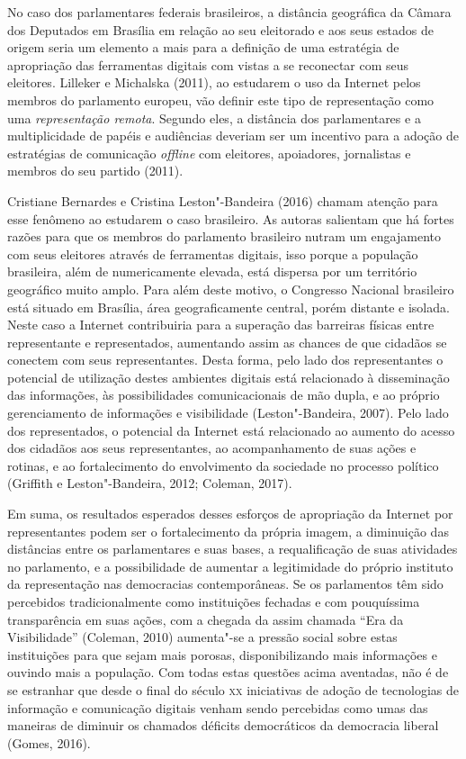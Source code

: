 No caso dos parlamentares federais brasileiros, a distância geográfica
da Câmara dos Deputados em Brasília em relação ao seu eleitorado e aos
seus estados de origem seria um elemento a mais para a definição de uma
estratégia de apropriação das ferramentas digitais com vistas a se
reconectar com seus eleitores. Lilleker e Michalska (2011), ao estudarem
o uso da Internet pelos membros do parlamento europeu, vão definir este
tipo de representação como uma \emph{representação remota}. Segundo
eles, a distância dos parlamentares e a multiplicidade de papéis e
audiências deveriam ser um incentivo para a adoção de estratégias de
comunicação \emph{offline} com eleitores, apoiadores, jornalistas e membros do
seu partido (2011).

Cristiane Bernardes e Cristina Leston"-Bandeira (2016) chamam atenção
para esse fenômeno ao estudarem o caso brasileiro. As autoras salientam
que há fortes razões para que os membros do parlamento brasileiro nutram
um engajamento com seus eleitores através de ferramentas digitais, isso
porque a população brasileira, além de numericamente elevada, está
dispersa por um território geográfico muito amplo. Para além deste
motivo, o Congresso Nacional brasileiro está situado em Brasília, área
geograficamente central, porém distante e isolada. Neste caso a Internet
contribuiria para a superação das barreiras físicas entre representante
e representados, aumentando assim as chances de que cidadãos se conectem
com seus representantes. Desta forma, pelo lado dos representantes o
potencial de utilização destes ambientes digitais está relacionado à
disseminação das informações, às possibilidades comunicacionais de mão
dupla, e ao próprio gerenciamento de informações e visibilidade
(Leston"-Bandeira, 2007). Pelo lado dos representados, o potencial da
Internet está relacionado ao aumento do acesso dos cidadãos aos seus
representantes, ao acompanhamento de suas ações e rotinas, e ao
fortalecimento do envolvimento da sociedade no processo político
(Griffith e Leston"-Bandeira, 2012; Coleman, 2017).

Em suma, os resultados esperados desses esforços de apropriação da
Internet por representantes podem ser o fortalecimento da própria
imagem, a diminuição das distâncias entre os parlamentares e suas bases,
a requalificação de suas atividades no parlamento, e a possibilidade de
aumentar a legitimidade do próprio instituto da representação nas
democracias contemporâneas. Se os parlamentos têm sido percebidos
tradicionalmente como instituições fechadas e com pouquíssima
transparência em suas ações, com a chegada da assim chamada ``Era da
Visibilidade'' (Coleman, 2010) aumenta"-se a pressão social sobre estas
instituições para que sejam mais porosas, disponibilizando mais
informações e ouvindo mais a população. Com todas estas questões acima
aventadas, não é de se estranhar que desde o final do século \textsc{xx}
iniciativas de adoção de tecnologias de informação e comunicação
digitais venham sendo percebidas como umas das maneiras de diminuir os
chamados déficits democráticos da democracia liberal (Gomes, 2016).

